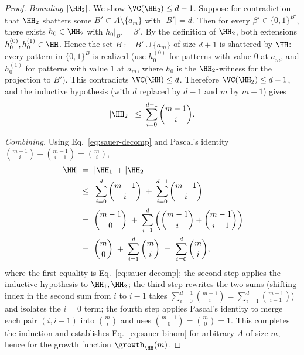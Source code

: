 \begin{proof}
\emph{Bounding $|\HH_2|$.} We show $\VC(\HH_2) \le d - 1$. Suppose for contradiction that $\HH_2$ shatters some $B' \subset A \setminus \{a_m\}$ with $|B'| = d$. Then for every $\beta' \in \{0,1\}^{B'}$, there exists $h_0 \in \HH_2$ with $h_0|_{B'} = \beta'$. By the definition of $\HH_2$, both extensions $h_0^{(0)}, h_0^{(1)} \in \HH$. Hence the set $B := B' \cup \{a_m\}$ of size $d+1$ is shattered by $\HH$: every pattern in $\{0,1\}^B$ is realized (use $h_0^{(0)}$ for patterns with value $0$ at $a_m$, and $h_0^{(1)}$ for patterns with value $1$ at $a_m$, where $h_0$ is the $\HH_2$-witness for the projection to $B'$). This contradicts $\VC(\HH) \le d$. Therefore $\VC(\HH_2) \le d - 1$, and the inductive hypothesis (with $d$ replaced by $d - 1$ and $m$ by $m - 1$) gives
\begin{align*}
|\HH_2| \;\le\; \sum_{i=0}^{d-1} \binom{m-1}{i}.
\end{align*}

\emph{Combining.} Using Eq.~\eqref{eq:sauer-decomp} and Pascal's identity $\binom{m-1}{i} + \binom{m-1}{i-1} = \binom{m}{i}$,
\begin{align*}
|\HH|
\;=\; & ~ |\HH_1| + |\HH_2| \\
\;\le\; & ~ \sum_{i=0}^{d} \binom{m-1}{i} \;+\; \sum_{i=0}^{d-1} \binom{m-1}{i} \\
\;=\; & ~ \binom{m-1}{0} \;+\; \sum_{i=1}^{d} \left( \binom{m-1}{i} + \binom{m-1}{i-1} \right) \\
\;=\; & ~ \binom{m}{0} \;+\; \sum_{i=1}^{d} \binom{m}{i}
\;=\; \sum_{i=0}^{d} \binom{m}{i},
\end{align*}
where the first equality is Eq.~\eqref{eq:sauer-decomp}; the second step applies the inductive hypothesis to $\HH_1, \HH_2$; the third step rewrites the two sums (shifting index in the second sum from $i$ to $i - 1$ takes $\sum_{i=0}^{d-1}\binom{m-1}{i} = \sum_{i=1}^{d}\binom{m-1}{i-1}$) and isolates the $i = 0$ term; the fourth step applies Pascal's identity to merge each pair $(i, i-1)$ into $\binom{m}{i}$ and uses $\binom{m-1}{0} = \binom{m}{0} = 1$. This completes the induction and establishes Eq.~\eqref{eq:sauer-binom} for arbitrary $A$ of size $m$, hence for the growth function $\growth_\HH(m)$.


\end{proof}
